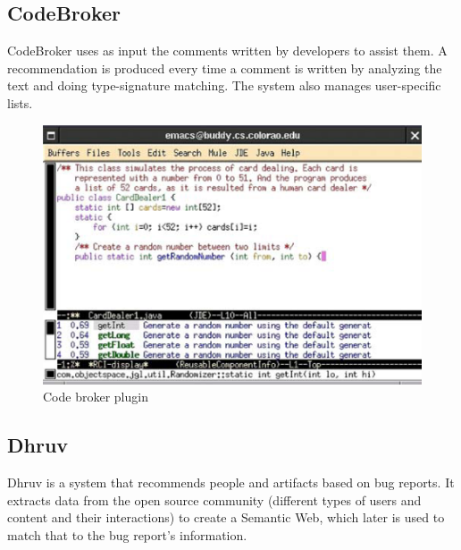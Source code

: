 \documentclass{l4proj}
\begin{document}
\subsection{CodeBroker}
CodeBroker uses as input the comments written by developers to assist them. A recommendation is produced every time a comment is written by analyzing the text and doing type-signature matching. The system also manages user-specific lists.

\begin{figure}[H]
\includegraphics[scale=0.4]{code-broker}
\centering
\caption{Code broker plugin}\label{code-broker}
\label{fig:code-broker}
\end{figure}

\subsection{Dhruv}
Dhruv is a system that recommends people and artifacts based on bug reports. It extracts data from the open source community (different types of users and content and their interactions) to create a Semantic Web, which later is used to match that to the bug report's information.
\end{document}
